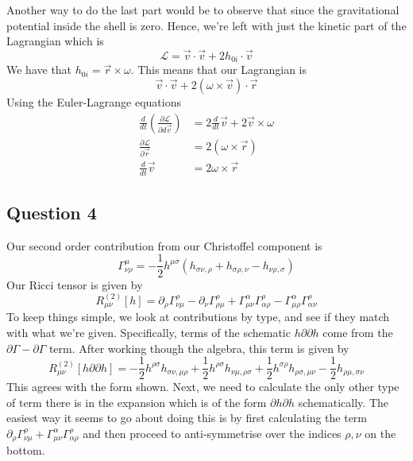 Another way to do the last part 
would be to observe that since 
the gravitational potential inside the 
shell is zero. 
Hence, we're left with just the kinetic part of 
the Lagrangian which is 
\[
	\mathcal{ L }  = \vec{v} \cdot  \vec{v} + 2 h_{ 0i } \cdot \vec{v}
\] 
We have that $ h _{ 0i  }  = \vec{r} \times \omega $. 
This means that our Lagrangian is 
\[
	\vec{v} \cdot  \vec{v} +  2 \left( \omega \times \vec{v}  \right)  \cdot  \vec{r}
\] Using the Euler-Lagrange equations
\begin{align*}
	\frac{ d }{ dt } \left( \frac{\partial  \mathcal{ L } }{\partial  d \vec{v} }  	
	\right)  & = 2 \frac{ d }{ dt } \vec{v} 	 + 
	 2 \vec{v} \times \omega \\
	 \frac{\partial  \mathcal{ L  } }{\partial \vec{r} 	 }
		 &=  2 \left( \omega \times \vec{r}  \right)   \\ 
		 \frac{d}{ dt  } \vec{v} &=  2 \omega \times \vec{r} 
\end{align*}
\pagebreak
\subsection{Question 4}
Our second order contribution from 
our Christoffel component is 
\[
\Gamma ^ \mu _{ \nu \rho }  = - \frac{1}{2 } h ^{ \mu \sigma } ( h_{ \sigma \nu , \rho } 
+ h _{ \sigma \rho , \nu }  - h _{ \nu \rho , \sigma } 	 )
\] Our Ricci tensor is given by 
\[
R_{ \mu \nu } ^{ \left(  2  \right)  } \left[  h  \right]   = 
\partial  _ \rho \Gamma ^{ \rho } _{ \nu \mu }  - \partial  _ \nu \Gamma ^{ \rho } _{ \rho \mu } 
+ \Gamma ^{ \alpha } _{ \mu \nu } \Gamma ^{ \rho } _{ \alpha \rho }  - 
\Gamma ^{ \alpha } _{ \mu \rho } \Gamma ^{ \rho } _{ \alpha \nu } 
\] To keep things simple, we look at contributions 
by type, and see if they match with what we're given. 
Specifically, terms of the schematic $ h \partial  \partial  h $ 
come from the $ \partial  \Gamma  - \partial  \Gamma $ term. 
After working though the algebra, this term is given by 
\[
R_{ \mu \nu } ^{ \left(  2  \right)  } \left[  h \partial  \partial  h  \right]  
=  - \frac{1}{2 } h ^{ \rho \sigma } h_{ \sigma \nu , \mu \rho } + \frac{1}{2 } 
h ^{ \rho \sigma } h _{ \nu \mu , \rho \sigma  } + 
\frac{1}{2 } h ^{ \sigma \rho } h _{ \rho \sigma, \mu \nu } - \frac{1}{2 } 
h _{ \rho \mu , \sigma \nu } 
\] This agrees with the form shown.
Next, we need to calculate the only other type of 
term there is in the expansion which is of the form $ \partial  h \partial  h $ 
schematically. 
The easiest way it seems to go about doing this 
is by first calculating the term $ \partial  _ \rho \Gamma ^ \rho_{ \nu \mu }  + \Gamma ^{ \alpha } _{ \mu \nu } \Gamma ^{ \rho } _{ \alpha \rho }$ and then proceed to 
anti-symmetrise over the indices $ \rho , \nu $ on the bottom.

